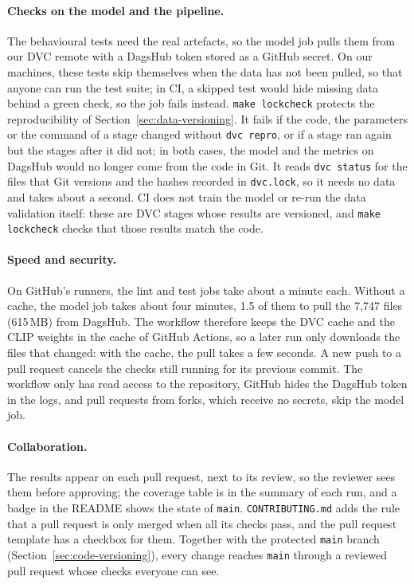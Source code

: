 \documentclass[11pt]{article}
\begin{document}
\paragraph{Checks on the model and the pipeline.} The behavioural tests need the real artefacts, so the model job pulls them from our DVC remote with a DagsHub token stored as a GitHub secret. On our machines, these tests skip themselves when the data has not been pulled, so that anyone can run the test suite; in CI, a skipped test would hide missing data behind a green check, so the job fails instead. \texttt{make lockcheck} protects the reproducibility of Section~\ref{sec:data-versioning}. It fails if the code, the parameters or the command of a stage changed without \texttt{dvc repro}, or if a stage ran again but the stages after it did not; in both cases, the model and the metrics on DagsHub would no longer come from the code in Git. It reads \texttt{dvc status} for the files that Git versions and the hashes recorded in \texttt{dvc.lock}, so it needs no data and takes about a second. CI does not train the model or re-run the data validation itself: these are DVC stages whose results are versioned, and \texttt{make lockcheck} checks that those results match the code.

\paragraph{Speed and security.} On GitHub's runners, the lint and test jobs take about a minute each. Without a cache, the model job takes about four minutes, 1.5 of them to pull the 7{,}747 files (615\,MB) from DagsHub. The workflow therefore keeps the DVC cache and the CLIP weights in the cache of GitHub Actions, so a later run only downloads the files that changed: with the cache, the pull takes a few seconds. A new push to a pull request cancels the checks still running for its previous commit. The workflow only has read access to the repository, GitHub hides the DagsHub token in the logs, and pull requests from forks, which receive no secrets, skip the model job.

\paragraph{Collaboration.} The results appear on each pull request, next to its review, so the reviewer sees them before approving; the coverage table is in the summary of each run, and a badge in the README shows the state of \texttt{main}. \texttt{CONTRIBUTING.md} adds the rule that a pull request is only merged when all its checks pass, and the pull request template has a checkbox for them. Together with the protected \texttt{main} branch (Section~\ref{sec:code-versioning}), every change reaches \texttt{main} through a reviewed pull request whose checks everyone can see.
\end{document}
